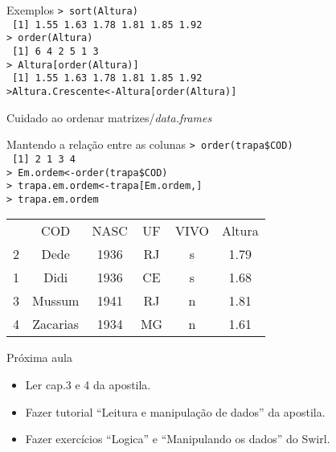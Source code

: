 \documentclass{beamer}
\begin{document}
\begin{frame}{Exemplos}
\texttt{> sort(Altura)\\
~[1] 1.55 1.63 1.78 1.81 1.85 1.92\\ \vspace{10pt} \pause
> order(Altura)\\
~[1] 6 4 2 5 1 3 \\ \vspace{10pt} \pause
> Altura[order(Altura)]\\
~[1] 1.55 1.63 1.78 1.81 1.85 1.92\\
>Altura.Crescente<-Altura[order(Altura)]}  
\end{frame}
\begin{frame}{Cuidado ao ordenar matrizes/\textit{data.frames}}
\centering
{}  
\end{frame}

\begin{frame}{Mantendo a relação entre as colunas}
\texttt{> order(trapa\$COD)\\
~[1] 2 1 3 4\\ \vspace{10pt}
> Em.ordem<-order(trapa\$COD)\\ \pause
> trapa.em.ordem<-trapa[Em.ordem,]\\
> trapa.em.ordem}
 \begin{table}[!h]
\begin{tabular}{cccccc}
      & COD & NASC & UF & VIVO & Altura\\
2 &    Dede & 1936 &  RJ&    s &  1.79\\
1 &    Didi & 1936 & CE &   s &  1.68\\
3 &  Mussum & 1941 & RJ &   n  & 1.81\\
4 &Zacarias  & 1934 & MG &    n &  1.61\\
\end{tabular}
\end{table}
  \end{frame}

  \begin{frame}{Próxima aula}
    \begin{itemize}
    \item Ler cap.3 e  4 da apostila.
    \item  Fazer tutorial ``Leitura e manipulação de dados'' da apostila.
    \item  Fazer exercícios ``Logica'' e ``Manipulando os dados'' do Swirl.
    \end{itemize}
  \end{frame}
\end{document}
